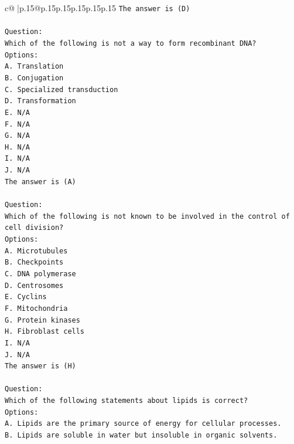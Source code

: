 \documentclass{article}
\begin{document}
{\begin{supertabular}{c@{$\;$}|p{.15\linewidth}@{}p{.15\linewidth}p{.15\linewidth}p{.15\linewidth}p{.15\linewidth}p{.15\linewidth}}
{{{\texttt{The answer is (D)} \\
\\ 
\texttt{Question:} \\
\texttt{Which of the following is not a way to form recombinant DNA?} \\
\texttt{Options:} \\
\texttt{A. Translation} \\
\texttt{B. Conjugation} \\
\texttt{C. Specialized transduction} \\
\texttt{D. Transformation} \\
\texttt{E. N/A} \\
\texttt{F. N/A} \\
\texttt{G. N/A} \\
\texttt{H. N/A} \\
\texttt{I. N/A} \\
\texttt{J. N/A} \\
\texttt{The answer is (A)} \\
\\ 
\texttt{Question:} \\
\texttt{Which of the following is not known to be involved in the control of cell division?} \\
\texttt{Options:} \\
\texttt{A. Microtubules} \\
\texttt{B. Checkpoints} \\
\texttt{C. DNA polymerase} \\
\texttt{D. Centrosomes} \\
\texttt{E. Cyclins} \\
\texttt{F. Mitochondria} \\
\texttt{G. Protein kinases} \\
\texttt{H. Fibroblast cells} \\
\texttt{I. N/A} \\
\texttt{J. N/A} \\
\texttt{The answer is (H)} \\
\\ 
\texttt{Question:} \\
\texttt{Which of the following statements about lipids is correct?} \\
\texttt{Options:} \\
\texttt{A. Lipids are the primary source of energy for cellular processes.} \\
\texttt{B. Lipids are soluble in water but insoluble in organic solvents.} \\
}}}
\end{supertabular}}
\end{document}
